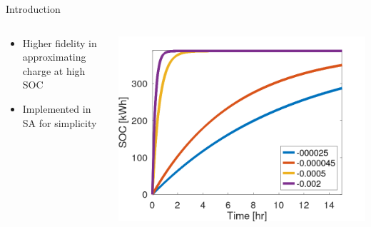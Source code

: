 \documentclass[aspectratio=169,dvipsnames]{beamer}
\begin{document}
\begin{frame}[label={sec:org68a1a45}]{Introduction}
\begin{columns}
\begin{column}{0.3\columnwidth}
\begin{itemize}
\item Higher fidelity in approximating charge at high SOC
\item Implemented in SA for simplicity
\end{itemize}
\end{column}

\begin{column}{0.7\columnwidth}
\begin{center}
\includegraphics[width=.9\linewidth]{./img/nonlinear-bat.png}
\end{center}
\end{column}
\end{columns}
\end{frame}
\end{document}

